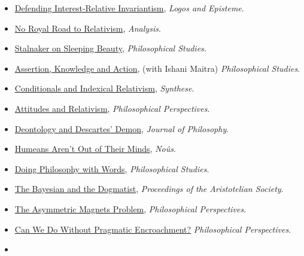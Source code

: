 \documentclass[
  10pt,
  letterpaper,
  DIV=11,
  numbers=noendperiod,
  twoside]{scrartcl}
\begin{document}
\begin{itemize}
{  Temporal Generality Problem}, \emph{Logos and Episteme}.
\item
  \href{https://brian.weatherson.org/quarto/posts/diri/defending-interest-relative-invariantism.html}{Defending
  Interest-Relative Invariantism}, \emph{Logos and Episteme}.
\item
  \href{https://brian.weatherson.org/quarto/posts/nrrtr/no-royal-road-to-relativism.html}{No
  Royal Road to Relativism}, \emph{Analysis}.
\item
  \href{https://brian.weatherson.org/quarto/posts/stalnaker-sleeping-beauity/stalnaker-on-sleeping-beauty.html}{Stalnaker
  on Sleeping Beauty}, \emph{Philosophical Studies}.
\item
  \href{https://brian.weatherson.org/quarto/posts/aka/assertion-knowledge-and-action.html}{Assertion,
  Knowledge and Action}, (with Ishani Maitra) \emph{Philosophical
  Studies}.
\item
  \href{https://brian.weatherson.org/quarto/posts/cair/conditionals-and-indexical-relativism.html}{Conditionals
  and Indexical Relativism}, \emph{Synthese}.
\item
  \href{https://brian.weatherson.org/quarto/posts/relative-attitude/attitudes-and-relativism.html}{Attitudes
  and Relativism}, \emph{Philosophical Perspectives}.
\item
  \href{https://brian.weatherson.org/quarto/posts/ddd/deontology-and-descartess-demon.html}{Deontology
  and Descartes' Demon}, \emph{Journal of Philosophy}.
\item
  \href{https://brian.weatherson.org/quarto/posts/haootm/humeans-arent-out-of-their-minds.html}{Humeans
  Aren't Out of Their Minds}, \emph{Noûs}.
\item
  \href{https://brian.weatherson.org/quarto/posts/dpww/doing-philosophy-with-words.html}{Doing
  Philosophy with Words}, \emph{Philosophical Studies}.
\item
  \href{https://brian.weatherson.org/quarto/posts/bayesdog/the-bayesian-and-the-dogmatist.html}{The
  Bayesian and the Dogmatist}, \emph{Proceedings of the Aristotelian
  Society}.
\item
  \href{https://brian.weatherson.org/quarto/posts/tamp/the-asymmetric-magnets-problem.html}{The
  Asymmetric Magnets Problem}, \emph{Philosophical Perspectives}.
\item
  \href{https://brian.weatherson.org/quarto/posts/cwpwpe/can-we-do-without-pragmatic-encroachment.html}{Can
  We Do Without Pragmatic Encroachment?} \emph{Philosophical
  Perspectives}.
\item

\end{itemize}
\end{document}
